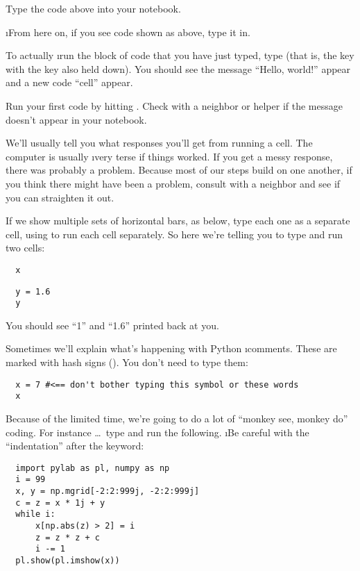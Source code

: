 \documentclass[letterpaper, 12pt, titlepage, twoside]{article}
\begin{document}
\begin{action}
  Type the code above into your notebook.

  \i{From here on, if you see code shown as above, type it in.}
\end{action}

To actually \i{run} the block of code that you have just typed, type
 (that is, the  key with the  key also held
down). You should see the message ``Hello, world!'' appear and a new code
“cell” appear.

\begin{action}
  Run your first code by hitting . Check with a neighbor or
  helper if the message  doesn't appear in your notebook.
\end{action}

We'll usually tell you what responses you'll get from running a cell. The
computer is usually \i{very} terse if things worked. If you get a messy
response, there was probably a problem. Because most of our steps build on one
another, if you think there might have been a problem, consult with a neighbor
and see if you can straighten it out.

If we show multiple sets of horizontal bars, as below, type each one as a
separate cell, using  to run each cell separately. So here
we're telling you to type and run two cells:

\begin{lstlisting}
  x
\end{lstlisting}
\begin{lstlisting}
  y = 1.6
  y
\end{lstlisting}

You should see ``1'' and ``1.6'' printed back at you.

Sometimes we'll explain what's happening with Python \i{comments}. These are
marked with hash signs (\s{\#}). You don't need to type them:

\begin{lstlisting}
  x = 7 #<== don't bother typing this symbol or these words
  x
\end{lstlisting}

Because of the limited time, we're going to do a lot of ``monkey see, monkey
do'' coding. For instance \ldots\ type and run the following. \i{Be careful
  with the ``indentation'' after the  keyword}:

\begin{lstlisting}
  import pylab as pl, numpy as np
  i = 99
  x, y = np.mgrid[-2:2:999j, -2:2:999j]
  c = z = x * 1j + y
  while i:
      x[np.abs(z) > 2] = i
      z = z * z + c
      i -= 1
  pl.show(pl.imshow(x))
\end{lstlisting}
\end{document}
